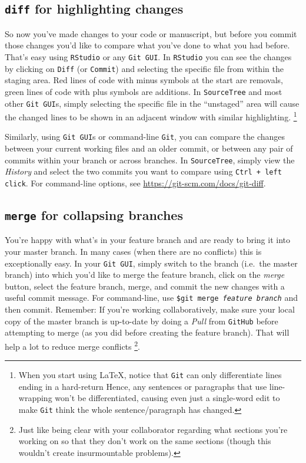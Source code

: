 \documentclass[12pt,letterpaper]{article}
\begin{document}
\subsection{\texttt{diff} for highlighting changes}
So now you've made changes to your code or manuscript, 
but before you commit those changes you'd like to compare what you've done 
to what you had before.
That's easy using \texttt{RStudio} or any \texttt{Git GUI}.
In \texttt{RStudio} you can see the changes by clicking on \texttt{Diff}
(or \texttt{Commit}) and selecting the specific file from within the staging area.
Red lines of code with minus symbols at the start are removals, 
green lines of code with plus symbols are additions.
In \texttt{SourceTree} and most other \texttt{Git GUI}s, 
simply selecting the specific file in the ``unstaged'' area will cause the changed 
lines to be shown in an adjacent window with similar highlighting.
\unskip
\footnote{When you start using \LaTeX, 
	notice that \texttt{Git} can only differentiate lines ending in a hard-return
	Hence, any sentences or paragraphs that use line-wrapping won't be
	differentiated, causing even just a single-word edit to make \texttt{Git} think 
	the whole sentence/paragraph has changed.}

Similarly, using \texttt{Git GUI}s or command-line \texttt{Git}, you can compare 
the changes between your current working files and an older commit, 
or between any pair of commits within your branch or across branches.
In \texttt{SourceTree}, simply view the \emph{History} and select the two commits you want to compare using \texttt{Ctrl + left click}.
For command-line options, see \url{https://git-scm.com/docs/git-diff}.


\subsection{\texttt{merge} for collapsing branches}

You're happy with what's in your feature branch and are ready to bring it into your master branch.
In many cases (when there are no conflicts) this is exceptionally easy.
In your \texttt{Git GUI}, simply switch to the branch (i.e.~the master branch) into 
which you'd like to merge the feature branch, 
click on the \emph{merge} button, 
select the feature branch, 
merge, and commit the new changes with a useful commit message.
For command-line, 
use \texttt{\$git merge \emph{feature branch}} and then commit.
Remember:  If you're working collaboratively, make sure your local copy of the master branch is up-to-date by doing a \emph{Pull} from \texttt{GitHub} before attempting to merge (as you did before creating the feature branch).
That will help a lot to reduce merge conflicts
\unskip
\footnote{Just like being clear with your collaborator regarding what sections
	 you're working on so that they don't work on the same sections
	 (though this wouldn't create insurmountable problems).}.
\end{document}
